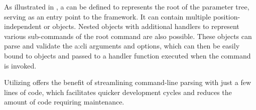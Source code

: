 As illustrated in , a  can be defined to represents the root of the parameter tree, serving as an entry point to the framework. It can contain multiple position-independent  or  objects. Nested  objects with additional handlers to represent various sub-commands of the root command are also possible. These objects can parse and validate the \gls{a:cli} arguments and options, which can then be easily bound to objects and passed to a handler function executed when the command is invoked.

Utilizing  offers the benefit of streamlining command-line parsing with just a few lines of code, which facilitates quicker development cycles and reduces the amount of code requiring maintenance.

